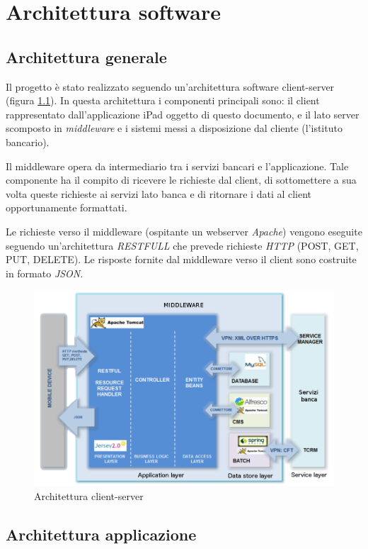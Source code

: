 \chapter{Architettura software}


\section{Architettura generale}

Il progetto è stato realizzato seguendo un'architettura software client-server (figura \ref{fig:arch}). In questa architettura i componenti principali sono: il client rappresentato dall'applicazione iPad oggetto di questo documento, e il lato server scomposto in \emph{middleware} e i sistemi messi a disposizione dal cliente (l'istituto bancario).

Il middleware opera da intermediario tra i servizi bancari e l'applicazione. Tale componente ha il compito di ricevere le richieste dal client, di sottomettere a sua volta queste richieste ai servizi lato banca e di ritornare i dati al client opportunamente formattati.

Le richieste verso il middleware (ospitante un webserver \emph{Apache}) vengono eseguite seguendo un'architettura \emph{RESTFULL}  che prevede richieste \emph{HTTP} (POST, GET, PUT, DELETE). Le risposte fornite dal middleware verso il client sono costruite in formato \emph{JSON}.


\begin{figure}[!htbp]
\centering
\includegraphics[scale=0.60]{architettura/architect.png}
\caption{Architettura client-server}
\label{fig:arch}
\end{figure}

\section{Architettura applicazione}

